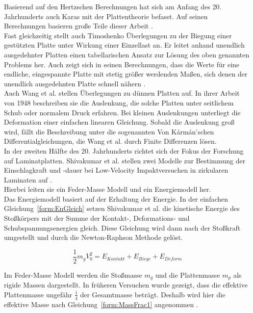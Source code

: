 Basierend auf den Hertzschen Berechnungen hat sich am Anfang des 20. Jahrhunderts auch Karas mit der Plattentheorie befasst. Auf seinen Berechnungen basieren große Teile dieser Arbeit \cite{Karas.1939}.\\
Fast gleichzeitig stellt auch Timoshenko\cite{Timoshenko.1922} Überlegungen zu der Biegung einer gestützten Platte unter Wirkung einer Einzellast an. Er leitet anhand unendlich ausgedehnter Platten einen tabellarischen Ansatz zur Lösung des oben genannten Problems her. Auch zeigt sich in seinen Berechnungen, dass die Werte für eine endliche, eingespannte Platte mit stetig größer werdenden Maßen, sich denen der unendlich ausgedehnten Platte schnell nähern .\\
Auch Wang et al.\cite{Wang.1947} stellen Überlegungen zu dünnen Platten auf. In ihrer Arbeit von 1948 beschreiben sie die Auslenkung, die solche Platten unter seitlichem Schub oder normalem Druck erfahren. Bei kleinen Auslenkungen unterliegt die Deformation einer einfachen linearen Gleichung. Sobald die Auslenkung groß wird, fällt die Beschreibung unter die sogenannten Von Kármán'schen Differentialgleichungen, die Wang et al. durch Finite Differenzen lösen.\\
In der zweiten Hälfte des 20. Jahrhunderts richtet sich der Fokus der Forschung auf Laminatplatten. Shivakumar et al. stellen zwei Modelle zur Bestimmung der Einschlagkraft und -dauer bei Low-Velocity Impaktversuchen in zirkularen Laminaten auf \cite{Shivakumar.1985}. \\
Hierbei leiten sie ein Feder-Masse Modell und ein Energiemodell her. \\
Das Energiemodell basiert auf der Erhaltung der Energie. In der einfachen Gleichung~\ref{form:EnGleich} setzen Shivakumar et al. die kinetische Energie des Stoßkörpers mit der Summe der Kontakt-, Deformations- und Schubspannungsenergien gleich. Diese Gleichung wird dann nach der Stoßkraft umgestellt und durch die Newton-Raphson Methode gelöst.

\begin{equation}
	\label{form:EnGleich}
	\frac{1}{2} m_{g} V_{0}^{2} = E_{Kontakt} + E_{Biege} + E_{Deform}
\end{equation}

Im Feder-Masse Modell werden die Stoßmasse $m_g$ und die Plattenmasse $m_p$ als rigide Massen dargestellt. In früheren Versuchen wurde gezeigt, dass die effektive Plattenmasse ungefähr $\frac{1}{4}$ der Gesamtmasse beträgt. Deshalb wird hier die effektive Masse nach Gleichung~\ref{form:MassFrac1} angenommen \cite{Shivakumar.1985}. 

